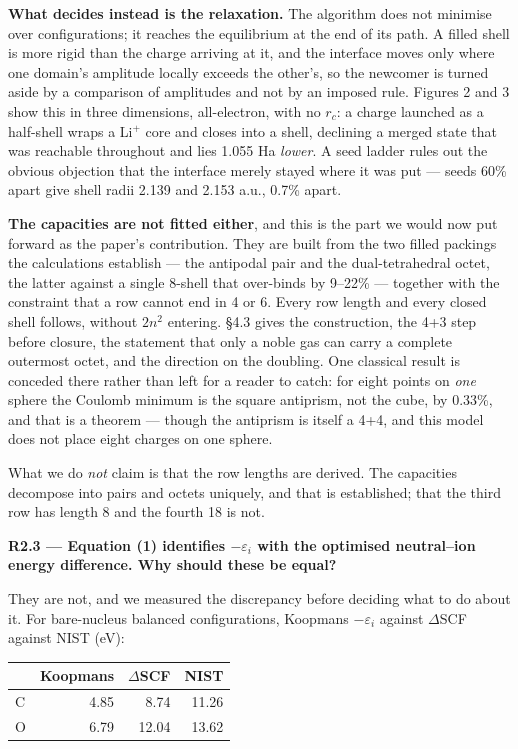\documentclass[11pt,a4paper]{article}
\begin{document}
\textbf{What decides instead is the relaxation.} The algorithm does not minimise over configurations; it
reaches the equilibrium at the end of its path. A filled shell is more rigid than the charge arriving
at it, and the interface moves only where one domain's amplitude locally exceeds the other's, so the
newcomer is turned aside by a comparison of amplitudes and not by an imposed rule. Figures 2 and 3
show this in three dimensions, all-electron, with no $r_c$: a charge launched as a half-shell wraps a
Li$^+$ core and closes into a shell, declining a merged state that was reachable throughout and lies
1.055 Ha \emph{lower}. A seed ladder rules out the obvious objection that the interface merely stayed
where it was put --- seeds 60\% apart give shell radii 2.139 and 2.153 a.u., 0.7\% apart.

\textbf{The capacities are not fitted either}, and this is the part we would now put forward as the
paper's contribution. They are built from the two filled packings the calculations establish --- the
antipodal pair and the dual-tetrahedral octet, the latter against a single 8-shell that over-binds by
9--22\% --- together with the constraint that a row cannot end in 4 or 6. Every row length and every
closed shell follows, without $2n^2$ entering. §4.3 gives the construction, the 4+3 step before
closure, the statement that only a noble gas can carry a complete outermost octet, and the direction
on the doubling. One classical result is conceded there rather than left for a reader to catch: for
eight points on \emph{one} sphere the Coulomb minimum is the square antiprism, not the cube, by 0.33\%, and
that is a theorem --- though the antiprism is itself a 4+4, and this model does not place eight charges
on one sphere.

What we do \emph{not} claim is that the row lengths are derived. The capacities decompose into pairs and
octets uniquely, and that is established; that the third row has length 8 and the fourth 18 is not.

\textbf{R2.3 --- Equation (1) identifies $-\varepsilon_i$ with the optimised neutral--ion energy
difference. Why should these be equal?}

They are not, and we measured the discrepancy before deciding what to do about it. For
bare-nucleus balanced configurations, Koopmans $-\varepsilon_i$ against $\Delta$SCF against
NIST (eV):

\begin{center}\begin{tabular}{lrrr}\hline
 & Koopmans & $\Delta$SCF & NIST \\ \hline
C & 4.85 & 8.74 & 11.26 \\
O & 6.79 & 12.04 & 13.62 \\
\hline\end{tabular}\end{center}
\end{document}
